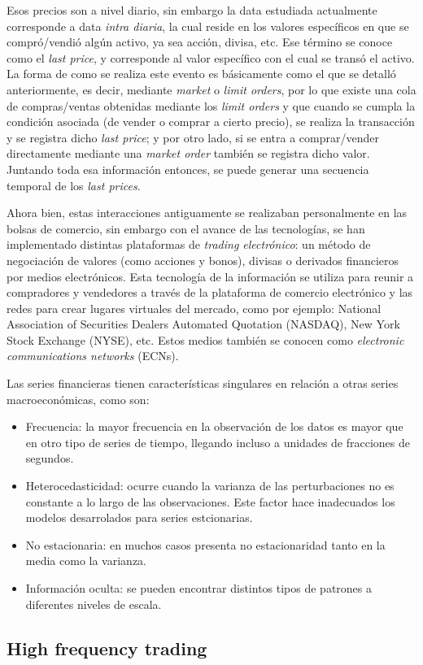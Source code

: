 Esos precios son a nivel diario, sin embargo la data estudiada actualmente corresponde a data \emph{intra diaria}, la cual reside en los valores
específicos en que se compró/vendió algún activo, ya sea acción, divisa, etc. Ese término se conoce como el \emph{last price}, y corresponde
al valor específico con el cual se transó el activo. La forma de como se realiza este evento es básicamente como el que se detalló anteriormente,
es decir, mediante \emph{market} o \emph{limit orders}, por lo que existe una cola de compras/ventas obtenidas mediante los \emph{limit orders} y que cuando
se cumpla la condición asociada (de vender o comprar a cierto precio), se realiza la transacción y se registra dicho \emph{last price}; 
y por otro lado, si se entra a comprar/vender directamente mediante una \emph{market order} también se registra dicho valor. 
Juntando toda esa información entonces, se puede generar una secuencia temporal de los \emph{last prices}.

Ahora bien, estas interacciones antiguamente se realizaban personalmente en las bolsas de comercio, sin embargo con el avance de las tecnologías,
se han implementado distintas plataformas de \emph{trading electrónico}: un método de negociación de valores (como acciones y bonos), divisas o derivados 
financieros por medios electrónicos. Esta tecnología de la información se utiliza para reunir a compradores y vendedores a través de la plataforma de 
comercio electrónico y las redes para crear lugares virtuales del mercado, como por ejemplo: National Association of Securities Dealers Automated 
Quotation (NASDAQ), New York Stock Exchange (NYSE), etc. Estos medios también se conocen como \emph{electronic communications networks} (ECNs).


Las series financieras tienen características singulares en relación a otras series macroeconómicas, como son: 
\begin{itemize}
	\item Frecuencia: la mayor frecuencia en la observación de los datos es mayor que en otro tipo de series de tiempo, llegando incluso
		a unidades de fracciones de segundos.
	\item Heterocedasticidad: ocurre cuando la varianza de las perturbaciones no es constante a lo largo de las observaciones.
		Este factor hace inadecuados los modelos desarrolados para series estcionarias.
	\item No estacionaria: en muchos casos presenta no estacionaridad tanto en la media como la varianza.
	\item Información oculta: se pueden encontrar distintos tipos de patrones a diferentes niveles de escala.
\end{itemize}

\subsection{High frequency trading}
